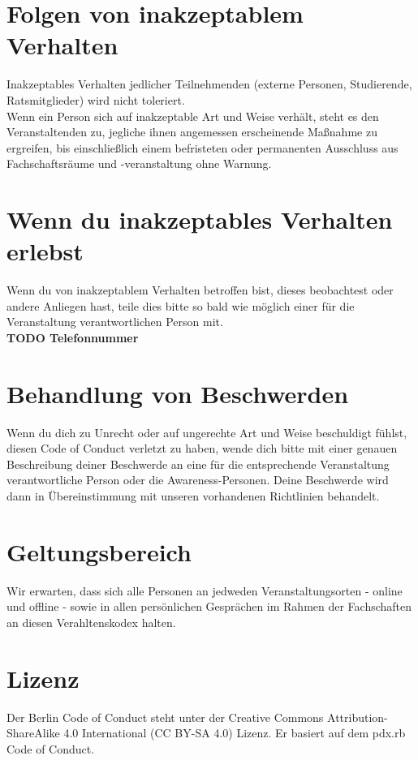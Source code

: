 \documentclass{article}
\begin{document}
\section{Folgen von inakzeptablem Verhalten}
Inakzeptables Verhalten jedlicher Teilnehmenden (externe Personen, Studierende, Ratsmitglieder) wird nicht toleriert.
\\
Wenn ein Person sich auf inakzeptable Art und Weise verhält, steht es den Veranstaltenden zu, jegliche ihnen angemessen erscheinende Maßnahme zu ergreifen, bis einschließlich einem befristeten oder permanenten Ausschluss aus Fachschaftsräume und -veranstaltung ohne Warnung.

\section{Wenn du inakzeptables Verhalten erlebst}
Wenn du von inakzeptablem Verhalten betroffen bist, dieses beobachtest oder andere Anliegen hast, teile dies bitte so bald wie möglich einer für die Veranstaltung verantwortlichen Person mit.
\\
\textbf{TODO Telefonnummer}

\section{Behandlung von Beschwerden}
Wenn du dich zu Unrecht oder auf ungerechte Art und Weise beschuldigt fühlst, diesen Code of Conduct verletzt zu haben, wende dich bitte mit einer genauen Beschreibung deiner Beschwerde an eine für die entsprechende Veranstaltung verantwortliche Person oder die Awareness-Personen. Deine Beschwerde wird dann in Übereinstimmung mit unseren vorhandenen Richtlinien behandelt.

\section{Geltungsbereich}
Wir erwarten, dass sich alle Personen an jedweden Veranstaltungsorten - online und offline - sowie in allen persönlichen Gesprächen im Rahmen der Fachschaften an diesen Verahltenskodex halten.

\section{Lizenz}
Der Berlin Code of Conduct steht unter der Creative Commons Attribution-ShareAlike 4.0 International (CC BY-SA 4.0) Lizenz. Er basiert auf dem pdx.rb Code of Conduct.
\end{document}
